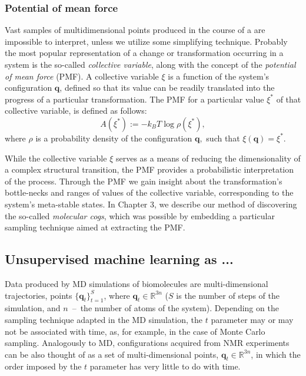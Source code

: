\documentclass[a4paper,11pt,twoside]{book}%
\begin{document}
\subsubsection{Potential of mean force}

Vast samples of multidimensional points produced in the course of a are impossible to interpret, unless we utilize some simplifying technique.
Probably the most popular representation of a change or transformation occurring in a system is the so-called \emph{collective variable}, along with the concept of the \emph{potential of mean force} (PMF).
A collective variable $\xi$ is a function of the system's configuration $\mathbf{q}$, defined so that its value can be readily translated into the progress of a particular transformation.
The PMF for a particular value $\xi^*$ of that collective variable, is defined as follows: 
$$ A(\xi^*):=-k_BT\log \rho (\xi^*), $$ 
where $\rho$ is a probability density of the configuration $\mathbf{q},$ such that $\xi(\mathbf{q})=\xi^*$.

While the collective variable $\xi$ serves as a means of reducing the dimensionality of a complex structural transition, the PMF provides a probabilistic interpretation of the process.
Through the PMF we gain insight about the transformation's bottle-necks and ranges of values of the collective variable, corresponding to the system's meta-stable states.
In Chapter 3, we describe our method of discovering the so-called \emph{molecular cogs}, which was possible by embedding a particular sampling technique aimed at extracting the PMF.

\subsection{Unsupervised machine learning as ...}

Data produced by MD simulations of biomolecules are multi-dimensional trajectories, points $\{ \mathbf{q}_t \}_{t=1}^S$, where $\mathbf{q}_t\in\mathbb{R}^{3n}$ ($S$ is the number of steps of the simulation, and $n$~--~the number of atoms of the system).
Depending on the sampling technique adapted in the MD simulation, the $t$ parameter may or may not be associated with time, as, for example, in the case of Monte Carlo sampling.
Analogously to MD, configurations acquired from NMR experiments can be also thought of as a set of multi-dimensional points, $\mathbf{q}_t\in\mathbb{R}^{3n}$, in which the order imposed by the $t$ parameter has very little to do with time.
\end{document}
